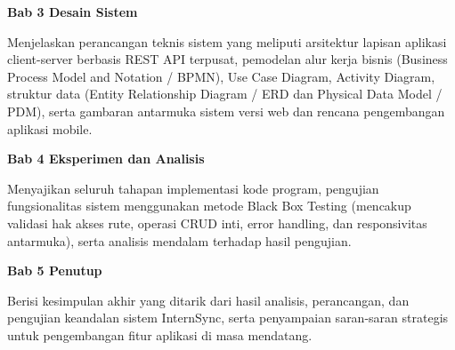 \noindent\textbf{Bab 3 Desain Sistem}\par\nopagebreak

Menjelaskan perancangan teknis sistem yang meliputi arsitektur lapisan aplikasi client-server berbasis REST API terpusat, pemodelan alur kerja bisnis (Business Process Model and Notation / BPMN), Use Case Diagram, Activity Diagram, struktur data (Entity Relationship Diagram / ERD dan Physical Data Model / PDM), serta gambaran antarmuka sistem versi web dan rencana pengembangan aplikasi mobile.

\noindent\textbf{Bab 4 Eksperimen dan Analisis}\par\nopagebreak

Menyajikan seluruh tahapan implementasi kode program, pengujian fungsionalitas sistem menggunakan metode Black Box Testing (mencakup validasi hak akses rute, operasi CRUD inti, error handling, dan responsivitas antarmuka), serta analisis mendalam terhadap hasil pengujian.

\noindent\textbf{Bab 5 Penutup}\par\nopagebreak

Berisi kesimpulan akhir yang ditarik dari hasil analisis, perancangan, dan pengujian keandalan sistem InternSync, serta penyampaian saran-saran strategis untuk pengembangan fitur aplikasi di masa mendatang.

